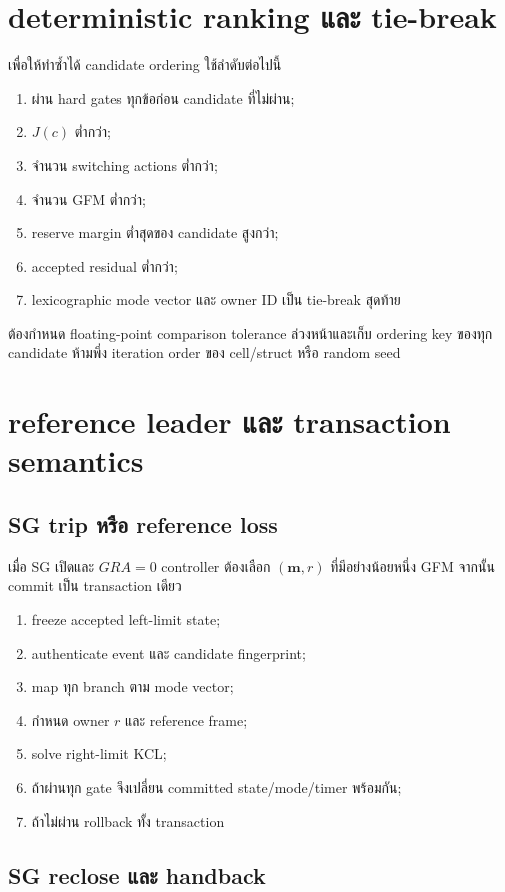 \documentclass[12pt,a4paper]{article}
\begin{document}
\section{deterministic ranking และ tie-break}

เพื่อให้ทำซ้ำได้ candidate ordering ใช้ลำดับต่อไปนี้
\begin{enumerate}
  \item ผ่าน hard gates ทุกข้อก่อน candidate ที่ไม่ผ่าน;
  \item $J(c)$ ต่ำกว่า;
  \item จำนวน switching actions ต่ำกว่า;
  \item จำนวน GFM ต่ำกว่า;
  \item reserve margin ต่ำสุดของ candidate สูงกว่า;
  \item accepted residual ต่ำกว่า;
  \item lexicographic mode vector และ owner ID เป็น tie-break สุดท้าย
\end{enumerate}
ต้องกำหนด floating-point comparison tolerance ล่วงหน้าและเก็บ ordering key ของทุก candidate
ห้ามพึ่ง iteration order ของ cell/struct หรือ random seed

\section{reference leader และ transaction semantics}

\subsection{SG trip หรือ reference loss}

เมื่อ SG เปิดและ $GRA=0$ controller ต้องเลือก $(\mathbf m,r)$ ที่มีอย่างน้อยหนึ่ง GFM
จากนั้น commit เป็น transaction เดียว
\begin{enumerate}
  \item freeze accepted left-limit state;
  \item authenticate event และ candidate fingerprint;
  \item map ทุก branch ตาม mode vector;
  \item กำหนด owner $r$ และ reference frame;
  \item solve right-limit KCL;
  \item ถ้าผ่านทุก gate จึงเปลี่ยน committed state/mode/timer พร้อมกัน;
  \item ถ้าไม่ผ่าน rollback ทั้ง transaction
\end{enumerate}

\subsection{SG reclose และ handback}
\end{document}
